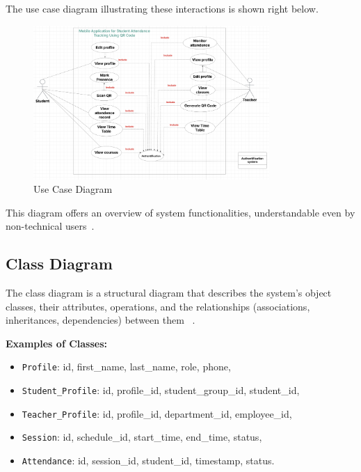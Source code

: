 \documentclass[12pt,a4paper]{report}
\begin{document}
The use case diagram illustrating these interactions is shown right below.
\begin{figure}[htbp]
    \centering
    \includegraphics[width=0.8\textwidth]{images/morsli/use_case2.png}
    \caption{Use Case Diagram}
    \label{fig:attendance-system}
\end{figure}

\vspace{9,5cm}
\newline
This diagram offers an overview of system functionalities, understandable even by non-technical users~\cite{fowler2004}.

\subsection{Class Diagram}
The class diagram is a structural diagram that describes the system's object classes, their attributes, operations, and the relationships (associations, inheritances, dependencies) between them ~\cite{fowler2004}.

\textbf{Examples of Classes:}
\begin{itemize}
  \item \texttt{Profile}: id, first\_name, last\_name, role, phone,
  \item \texttt{Student\_Profile}: id, profile\_id, student\_group\_id, student\_id,
  \item \texttt{Teacher\_Profile}: id, profile\_id, department\_id, employee\_id,
  \item \texttt{Session}: id, schedule\_id, start\_time, end\_time, status,
  \item \texttt{Attendance}: id, session\_id, student\_id, timestamp, status.
\end{itemize}
\end{document}
